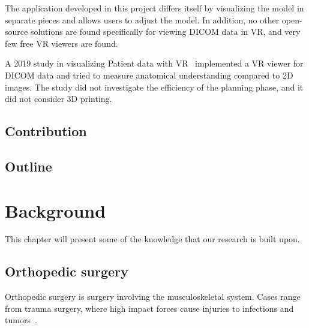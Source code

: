 \documentclass[a4paper]{report}
\begin{document}
The application developed in this project differs itself by visualizing the model in separate pieces and allows users to adjust the model.
In addition, no other open-source solutions are found specifically for viewing DICOM data in VR, and very few free VR viewers are found.

A 2019 study in visualizing Patient data with VR~\cite{vertemati_virtual_2019} implemented a VR viewer for DICOM data and tried to measure anatomical understanding compared to 2D images. The study did not investigate the efficiency of the planning phase, and it did not consider 3D printing.

\section{Contribution}
\section{Outline}

\chapter{Background}\label{Background}
This chapter will present some of the knowledge that our research is built upon.

\section{Orthopedic surgery}

Orthopedic surgery is surgery involving the musculoskeletal system. Cases range from trauma surgery, where high impact forces cause injuries to infections and tumors~\cite{swiontkowski_manual_2013}.
\end{document}
